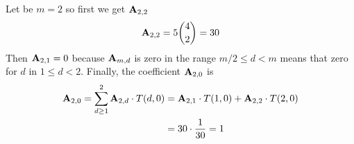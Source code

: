\begin{example}
    Let be $m=2$ so first we get ${\mathbf{A}} \sb{2,2}$
    \begin{equation*}
        {\mathbf{A}} \sb{2,2} = 5\binom{4}{2}=30
    \end{equation*}
    Then ${\mathbf{A}} \sb{2,1} = 0$ because ${\mathbf{A}} \sb{m,d}$ is zero in the range $m/2 \leq d < m$ means that zero for $d$
    in $1 \leq d < 2$.
    Finally, the coefficient ${\mathbf{A}} \sb{2,0}$ is
    \begin{equation*}
        \begin{split}
            {\mathbf{A}} \sb{2,0}
            = \sum_{d \geq 1}^{2} {\mathbf{A}} \sb{2,d} \cdot T(d, 0)
            &= {\mathbf{A}} \sb{2,1} \cdot T(1, 0) + {\mathbf{A}} \sb{2,2} \cdot T(2, 0) \\
            &= 30 \cdot \frac{1}{30} = 1
        \end{split}
    \end{equation*}
\end{example}
